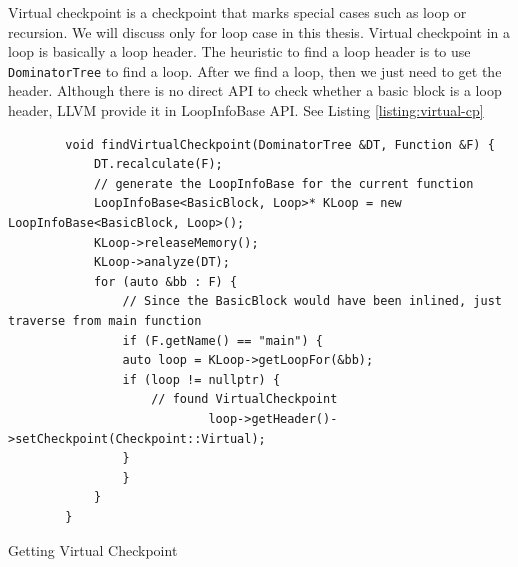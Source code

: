 Virtual checkpoint is a checkpoint that marks special cases such as loop or
recursion. We will discuss only for loop case in this thesis. Virtual checkpoint
in a loop is basically a loop header. The heuristic to find a loop header is to
use \texttt{DominatorTree} to find a loop. After we find a loop, then we just
need to get the header. Although there is no direct API to check whether a basic
block is a loop header, LLVM provide it in LoopInfoBase API. See Listing
\ref{listing:virtual-cp}

\begin{listing}[htbp]
    \begin{verbatim}
        void findVirtualCheckpoint(DominatorTree &DT, Function &F) {
            DT.recalculate(F);
            // generate the LoopInfoBase for the current function
            LoopInfoBase<BasicBlock, Loop>* KLoop = new LoopInfoBase<BasicBlock, Loop>();
            KLoop->releaseMemory();
            KLoop->analyze(DT);
            for (auto &bb : F) {
                // Since the BasicBlock would have been inlined, just traverse from main function
                if (F.getName() == "main") {
                auto loop = KLoop->getLoopFor(&bb);
                if (loop != nullptr) {
                    // found VirtualCheckpoint
                            loop->getHeader()->setCheckpoint(Checkpoint::Virtual);
                }
                }
            }
        }
    \end{verbatim}
    \caption{Getting Virtual Checkpoint}
    \label{listing:virtual-cp}
\end{listing}




